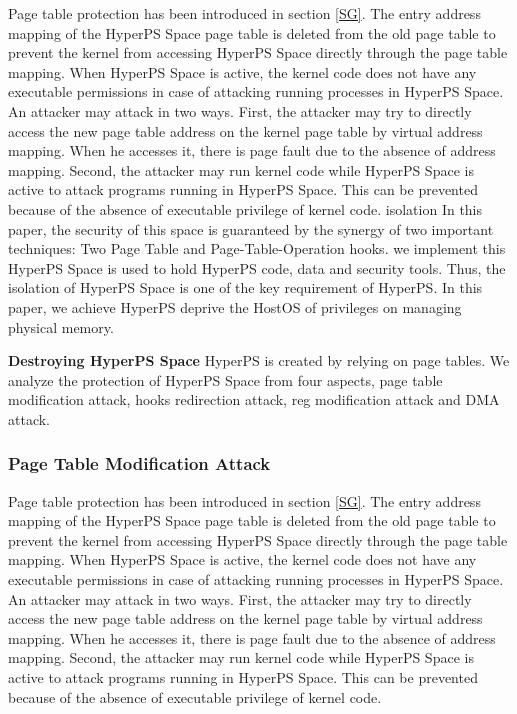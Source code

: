 Page table protection has been introduced in section \ref{SG}. The entry address mapping of the HyperPS Space page table is deleted from the old page table to prevent the kernel from accessing HyperPS Space directly through the page table mapping. When HyperPS Space is active, the kernel code does not have any executable permissions in case of attacking running processes in HyperPS Space. An attacker may attack in two ways.
First, the attacker may try to directly access the new page table address on the kernel page table by virtual address mapping. When he accesses it, there is page fault due to the absence of address mapping.
Second, the attacker may run kernel code while HyperPS Space is active to attack programs running in HyperPS Space. This can be prevented because of the absence of executable privilege of kernel code.
isolation
In this paper, the security of this space is guaranteed by the synergy of two important techniques: Two Page Table and Page-Table-Operation hooks.
we implement this 
HyperPS Space is used to hold HyperPS code, data and security tools. Thus, the isolation of HyperPS Space is one of the key requirement of HyperPS. 
In this paper, we achieve 
HyperPS deprive the HostOS of privileges on managing physical memory. 
\fi


\iffalse
\textbf{Destroying HyperPS Space}
HyperPS is created by relying on page tables.
We analyze the protection of HyperPS Space from four aspects, page table modification attack, hooks redirection attack, reg modification attack and DMA attack.


\subsubsection{Page Table Modification Attack}

Page table protection has been introduced in section \ref{SG}. The entry address mapping of the HyperPS Space page table is deleted from the old page table to prevent the kernel from accessing HyperPS Space directly through the page table mapping. When HyperPS Space is active, the kernel code does not have any executable permissions in case of attacking running processes in HyperPS Space. An attacker may attack in two ways.
First, the attacker may try to directly access the new page table address on the kernel page table by virtual address mapping. When he accesses it, there is page fault due to the absence of address mapping.
Second, the attacker may run kernel code while HyperPS Space is active to attack programs running in HyperPS Space. This can be prevented because of the absence of executable privilege of kernel code.



